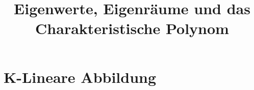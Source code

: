 \documentclass[12pt]{article}
\begin{document}
    \title{Eigenwerte, Eigenräume und das Charakteristische Polynom}
    \maketitle
    \section{K-Lineare Abbildung}
\end{document}
